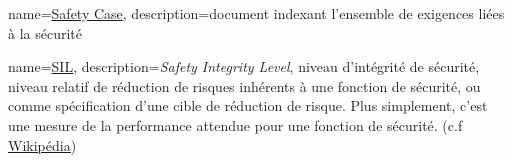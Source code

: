 {
	name=\underline{Safety Case},
	description={document indexant l'ensemble de exigences liées à la sécurité}
	}
	
{
	name=\underline{SIL},
	description={\textit{Safety Integrity Level}, niveau d'intégrité de sécurité, niveau relatif de réduction de risques inhérents à une fonction de sécurité, ou comme spécification d'une cible de réduction de risque. Plus simplement, c'est une mesure de la performance attendue pour une fonction de sécurité. (c.f \underline{\href{https://fr.wikipedia.org/wiki/Safety_Integrity_Level}{Wikipédia}})}
}



\glsaddall


